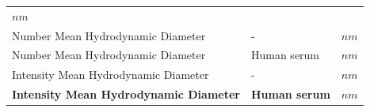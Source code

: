 \documentclass[utf8]{frontiersHLTH} %
\begin{document}
\begin{longtable}[]{@{}lll@{}}
\begin{minipage}[t]{0.13\columnwidth}
\(nm\)\strut
\end{minipage}\tabularnewline
\begin{minipage}[t]{0.58\columnwidth}\raggedright\strut
Number Mean Hydrodynamic Diameter\strut
\end{minipage} & \begin{minipage}[t]{0.20\columnwidth}\raggedright\strut
-\strut
\end{minipage} & \begin{minipage}[t]{0.13\columnwidth}\raggedright\strut
\(nm\)\strut
\end{minipage}\tabularnewline
\begin{minipage}[t]{0.58\columnwidth}\raggedright\strut
Number Mean Hydrodynamic Diameter\strut
\end{minipage} & \begin{minipage}[t]{0.20\columnwidth}\raggedright\strut
Human serum\strut
\end{minipage} & \begin{minipage}[t]{0.13\columnwidth}\raggedright\strut
\(nm\)\strut
\end{minipage}\tabularnewline
\begin{minipage}[t]{0.58\columnwidth}\raggedright\strut
Intensity Mean Hydrodynamic Diameter\strut
\end{minipage} & \begin{minipage}[t]{0.20\columnwidth}\raggedright\strut
-\strut
\end{minipage} & \begin{minipage}[t]{0.13\columnwidth}\raggedright\strut
\(nm\)\strut
\end{minipage}\tabularnewline
\begin{minipage}[t]{0.58\columnwidth}\raggedright\strut
\textbf{Intensity Mean Hydrodynamic Diameter}\strut
\end{minipage} & \begin{minipage}[t]{0.20\columnwidth}\raggedright\strut
\textbf{Human serum}\strut
\end{minipage} & \begin{minipage}[t]{0.13\columnwidth}\raggedright\strut
\(nm\)\strut
\end{minipage}\tabularnewline
\bottomrule
\end{longtable}
\end{document}
